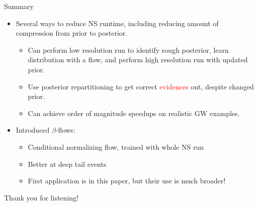 \documentclass[aspectratio=169, 11pt]{beamer}
\begin{document}
\begin{frame}{Summary}
    \begin{itemize}
        \item<1-> Several ways to reduce NS runtime, including reducing amount of compression from prior to posterior.
        \begin{itemize}
        \item<1-> Can perform low resolution run to identify rough posterior, learn distribution with a flow, and perform high resolution run with updated prior.
        \item<1-> Use posterior repartitioning to get correct \textcolor{red}{evidences} out, despite changed prior.
        \item<1-> Can achieve order of magnitude speedups on realistic GW examples.
        \end{itemize}\vfill
        \item<2-> Introduced $\beta$-flows:
        \begin{itemize}
            \item<2-> Conditional normalizing flow, trained with whole NS run
            \item<2-> Better at deep tail events
            \item<2-> First application is in this paper, but their use is much broader!
        \end{itemize}
    \end{itemize}
\end{frame}

\begin{frame}{}
    \centering
    Thank you for listening!
\end{frame}

\appendix
\end{document}
